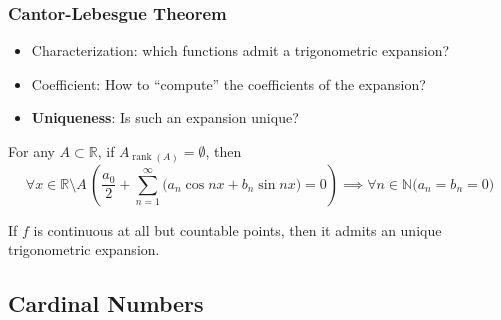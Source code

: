 \documentclass[UTF8,aspectratio=43,11pt,colorlinks,compress,openany]{beamer}%
\begin{document}
\begin{frame}\frametitle{Cantor-Lebesgue Theorem}
	\begin{itemize}
		\item Characterization: which functions admit a trigonometric expansion?
		\item Coefficient: How to ``compute'' the coefficients of the expansion?
		\item \textbf{Uniqueness}: Is such an expansion unique?
	\end{itemize}
	\begin{theorem}
		For any $A\subset\mathbb{R}$, if $A_{\operatorname{rank}(A)}=\emptyset$, then
		\[\forall x\in\mathbb{R}\!\setminus\!A\,\left(\dfrac{a_0}{2}+\sum\limits_{n=1}^\infty\big(a_n\cos nx+b_n\sin nx\big)=0\right)\implies\forall n\in\mathbb{N}\big(a_n=b_n=0\big)\]
	\end{theorem}
	If $f$ is continuous at all but countable points, then it admits an unique trigonometric expansion.
\end{frame}

\subsection{Cardinal Numbers}
\end{document}
